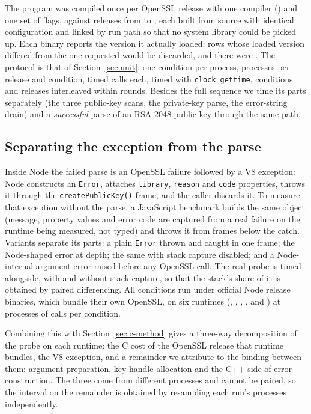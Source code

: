 \documentclass[preprint,12pt,authoryear]{elsarticle}
\begin{document}
The program was compiled once per OpenSSL release with one compiler
(\CProbeCompiler) and one set of flags, against \CProbeVersionCount{} releases
from \CProbeVersionFirst{} to \CProbeVersionLast{}, each built from source with
identical configuration and linked by run path so that no system library could
be picked up. Each binary reports the version it actually loaded; rows whose
loaded version differed from the one requested would be discarded, and there
were \CProbeIdentityMismatches. The protocol is that of
Section~\ref{sec:unit}: one condition per process, \CProbeInvocations{}
processes per release and condition, \CProbeCallsPerInvocation{} timed calls
each, timed with \texttt{clock\_gettime}, conditions and releases interleaved
within rounds. Besides the full sequence we time its parts separately (the
three public-key scans, the private-key parse, the error-string drain) and a
\emph{successful} parse of an RSA-2048 public key through the same path.

\subsection{Separating the exception from the parse}\label{sec:exc-method}

Inside Node the failed parse is an OpenSSL failure followed by a V8 exception:
Node constructs an \texttt{Error}, attaches \texttt{library}, \texttt{reason}
and \texttt{code} properties, throws it through the \texttt{createPublicKey()}
frame, and the caller discards it. To measure that exception without the
parse, a JavaScript benchmark builds the same object (message, property
values and error code are captured from a real failure on the runtime being
measured, not typed) and throws it from \ExcDepth{} frames below the catch.
Variants separate its parts: a plain \texttt{Error} thrown and caught in one
frame; the Node-shaped error at depth; the same with stack capture disabled;
and a Node-internal argument error raised before any OpenSSL call. The real
probe is timed alongside, with and without stack capture, so that the stack's
share of it is obtained by paired differencing. All conditions run under
official Node release binaries, which bundle their own OpenSSL, on six
runtimes (\RtEighteenLiteral, \RtTwentyLiteral, \RtTwentyTwoLiteral,
\RtTwentyThreeLiteral, \RtTwentyFourLiteral{} and \RtTwentySixLiteral{}) at
\ExcInvocations{} processes of \ExcCallsPerInvocation{} calls per condition.

Combining this with Section~\ref{sec:c-method} gives a three-way decomposition
of the probe on each runtime: the C cost of the OpenSSL release that runtime
bundles, the V8 exception, and a remainder we attribute to the binding between
them: argument preparation, key-handle allocation and the C++ side of error
construction. The three come from different processes and cannot be paired, so
the interval on the remainder is obtained by resampling each run's processes
independently.
\end{document}
